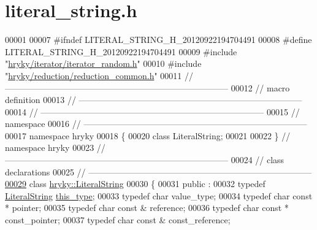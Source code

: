 \hypertarget{literal__string_8h_source}{\section{literal\-\_\-string.\-h}
}

\begin{DoxyCode}
00001 
00007 \textcolor{preprocessor}{#ifndef LITERAL\_STRING\_H\_20120922194704491}
00008 \textcolor{preprocessor}{}\textcolor{preprocessor}{#define LITERAL\_STRING\_H\_20120922194704491}
00009 \textcolor{preprocessor}{}\textcolor{preprocessor}{#include "\hyperlink{iterator__random_8h}{hryky/iterator/iterator_random.h}"}
00010 \textcolor{preprocessor}{#include "\hyperlink{reduction__common_8h}{hryky/reduction/reduction_common.h}"}
00011 \textcolor{comment}{//
      ------------------------------------------------------------------------------}
00012 \textcolor{comment}{// macro definition}
00013 \textcolor{comment}{//
      ------------------------------------------------------------------------------}
00014 \textcolor{comment}{//
      ------------------------------------------------------------------------------}
00015 \textcolor{comment}{// namespace}
00016 \textcolor{comment}{//
      ------------------------------------------------------------------------------}
00017 \textcolor{keyword}{namespace }hryky
00018 \{
00020     \textcolor{keyword}{class }LiteralString;
00021     
00022 \} \textcolor{comment}{// namespace hryky}
00023 \textcolor{comment}{//
      ------------------------------------------------------------------------------}
00024 \textcolor{comment}{// class declarations}
00025 \textcolor{comment}{//
      ------------------------------------------------------------------------------}
\hypertarget{literal__string_8h_source_l00029}{}\hyperlink{classhryky_1_1_literal_string}{00029} \textcolor{comment}{}\textcolor{keyword}{class }\hyperlink{classhryky_1_1_literal_string}{hryky::LiteralString}
00030 \{
00031 \textcolor{keyword}{public} :
00032     \textcolor{keyword}{typedef} \hyperlink{classhryky_1_1_literal_string}{LiteralString} \hyperlink{classhryky_1_1_literal_string}{this_type};
00033     \textcolor{keyword}{typedef} \textcolor{keywordtype}{char} value\_type;
00034     \textcolor{keyword}{typedef} \textcolor{keywordtype}{char} \textcolor{keyword}{const} * pointer;
00035     \textcolor{keyword}{typedef} \textcolor{keywordtype}{char} \textcolor{keyword}{const} & reference;
00036     \textcolor{keyword}{typedef} \textcolor{keywordtype}{char} \textcolor{keyword}{const} * const\_pointer;
00037     \textcolor{keyword}{typedef} \textcolor{keywordtype}{char} \textcolor{keyword}{const} & const\_reference;

\end{DoxyCode}
